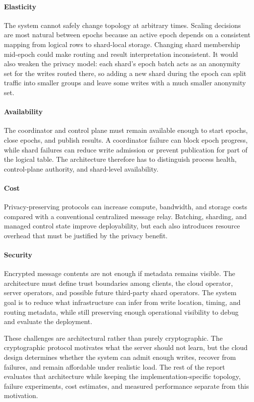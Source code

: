 \documentclass[conference]{IEEEtran}
\begin{document}
\paragraph{Elasticity}
The system cannot safely change topology at arbitrary times. Scaling decisions are most natural between epochs because an active epoch depends on a consistent mapping from logical rows to shard-local storage. Changing shard membership mid-epoch could make routing and result interpretation inconsistent. It would also weaken the privacy model: each shard's epoch batch acts as an anonymity set for the writes routed there, so adding a new shard during the epoch can split traffic into smaller groups and leave some writes with a much smaller anonymity set.

\paragraph{Availability}
The coordinator and control plane must remain available enough to start epochs, close epochs, and publish results. A coordinator failure can block epoch progress, while shard failures can reduce write admission or prevent publication for part of the logical table. The architecture therefore has to distinguish process health, control-plane authority, and shard-level availability.

\paragraph{Cost}
Privacy-preserving protocols can increase compute, bandwidth, and storage costs compared with a conventional centralized message relay. Batching, sharding, and managed control state improve deployability, but each also introduces resource overhead that must be justified by the privacy benefit.

\paragraph{Security}
Encrypted message contents are not enough if metadata remains visible. The architecture must define trust boundaries among clients, the cloud operator, server operators, and possible future third-party shard operators. The system goal is to reduce what infrastructure can infer from write location, timing, and routing metadata, while still preserving enough operational visibility to debug and evaluate the deployment.

These challenges are architectural rather than purely cryptographic. The cryptographic protocol motivates what the server should not learn, but the cloud design determines whether the system can admit enough writes, recover from failures, and remain affordable under realistic load. The rest of the report evaluates that architecture while keeping the implementation-specific topology, failure experiments, cost estimates, and measured performance separate from this motivation.
\end{document}

